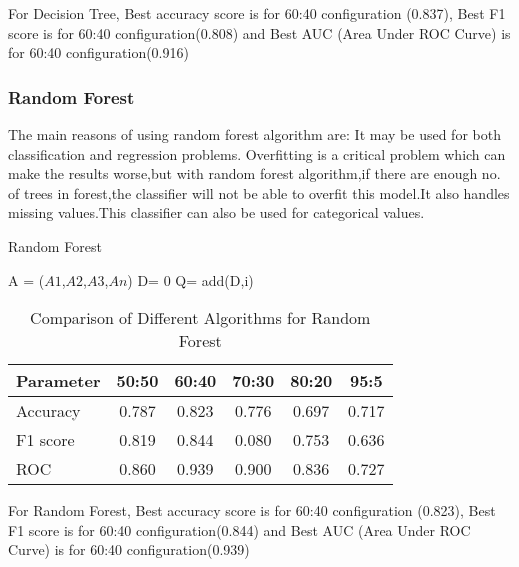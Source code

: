 \documentclass{article}
\begin{document}
For Decision Tree,
Best accuracy score is for 60:40 configuration (0.837),
Best F1 score is for 60:40 configuration(0.808) and
Best AUC (Area Under ROC Curve) is for 60:40 configuration(0.916)
\newpage
\subsubsection {Random Forest}
The main reasons of using random forest algorithm are: It may be used for both classification and regression problems. Overfitting is a critical problem which can make the results worse,but with random forest algorithm,if there are enough no. of trees in forest,the classifier will not be able to overfit this model.It also handles missing values.This classifier can also be used for categorical values.
\begin{algorithm}[!h] %
\caption{Random Forest} %
\label{algo1}
\begin{algorithmic}[1]
\State A = {($A1$,$A2$,$A3$,$An$)}
\State D= 0
\State Q= {add}{(D,i)}

\EndProcedure
\end{algorithmic}
\end{algorithm}

\begin{table}[!h]
\centering
\begin{tabular}{|l|c|c|c|c|c|}
\hline
\textbf{Parameter} &  \textbf{50:50} &  \textbf{60:40} &  \textbf{70:30} &  \textbf{80:20} &  \textbf{95:5} \\
\hline
Accuracy & 0.787 & 0.823 & 0.776 & 0.697 & 0.717\\
\hline
F1 score & 0.819 & 0.844 & 0.080 & 0.753 & 0.636\\
\hline
ROC & 0.860 & 0.939 & 0.900 & 0.836 & 0.727\\
\hline


\end{tabular}
\caption{Comparison of Different Algorithms for Random Forest}
\label{tbl:dataset}
\end{table}
\bigskip

For Random Forest,
Best accuracy score is for 60:40 configuration (0.823),
Best F1 score is for 60:40 configuration(0.844) and
Best AUC (Area Under ROC Curve) is for 60:40 configuration(0.939)



\newpage
\end{document}

